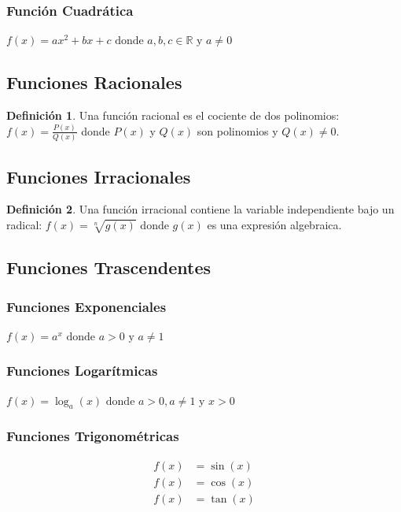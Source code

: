 \documentclass[12pt, a4paper, oneside]{book}
\theoremstyle{definition}
\newtheorem{definicion}{Definición}[chapter]
\begin{document}
\subsubsection{Función Cuadrática}
$f(x) = ax^2 + bx + c \text{ donde } a, b, c \in \mathbb{R} \text{ y } a \neq 0$

\subsection{Funciones Racionales}

\begin{definicion}
Una función racional es el cociente de dos polinomios:
$f(x) = \frac{P(x)}{Q(x)}$
donde $P(x)$ y $Q(x)$ son polinomios y $Q(x) \neq 0$.
\end{definicion}

\subsection{Funciones Irracionales}

\begin{definicion}
Una función irracional contiene la variable independiente bajo un radical:
$f(x) = \sqrt[n]{g(x)}$
donde $g(x)$ es una expresión algebraica.
\end{definicion}

\subsection{Funciones Trascendentes}

\subsubsection{Funciones Exponenciales}
$f(x) = a^x \text{ donde } a > 0 \text{ y } a \neq 1$

\subsubsection{Funciones Logarítmicas}
$f(x) = \log_a(x) \text{ donde } a > 0, a \neq 1 \text{ y } x > 0$

\subsubsection{Funciones Trigonométricas}
\begin{align}
f(x) &= \sin(x) \\
f(x) &= \cos(x) \\
f(x) &= \tan(x)
\end{align}
\end{document}
